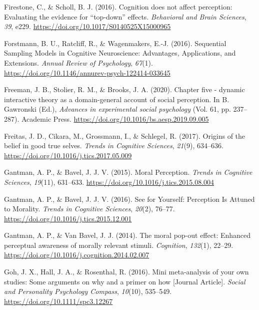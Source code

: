 \documentclass[
  man]{apa6}
\newlength{\cslhangindent}
\newlength{\cslentryspacingunit} %
\newenvironment{CSLReferences}[2] %
 {%
  \setlength{\parindent}{0pt}
  \ifodd #1
  \let\oldpar\par
  \def\par{\hangindent=\cslhangindent\oldpar}
  \fi
  \setlength{\parskip}{#2\cslentryspacingunit}
 }%
 {}
\begin{document}
\begin{CSLReferences}{1}{0}
\leavevmode{}%
Firestone, C., \& Scholl, B. J. (2016). Cognition does not affect perception: {Evaluating} the evidence for {``top-down''} effects. \emph{Behavioral and Brain Sciences}, \emph{39}, e229. \url{https://doi.org/10.1017/S0140525X15000965}

\leavevmode{}%
Forstmann, B. U., Ratcliff, R., \& Wagenmakers, E.-J. (2016). Sequential {Sampling} {Models} in {Cognitive} {Neuroscience}: {Advantages}, {Applications}, and {Extensions}. \emph{Annual Review of Psychology}, \emph{67}(1). \url{https://doi.org/10.1146/annurev-psych-122414-033645}

\leavevmode{}%
Freeman, J. B., Stolier, R. M., \& Brooks, J. A. (2020). Chapter five - dynamic interactive theory as a domain-general account of social perception. In B. Gawronski (Ed.), \emph{Advances in experimental social psychology} (Vol. 61, pp. 237--287). Academic Press. \url{https://doi.org/10.1016/bs.aesp.2019.09.005}

\leavevmode{}%
Freitas, J. D., Cikara, M., Grossmann, I., \& Schlegel, R. (2017). Origins of the belief in good true selves. \emph{Trends in Cognitive Sciences}, \emph{21}(9), 634--636. \url{https://doi.org/10.1016/j.tics.2017.05.009}

\leavevmode{}%
Gantman, A. P., \& Bavel, J. J. V. (2015). Moral {Perception}. \emph{Trends in Cognitive Sciences}, \emph{19}(11), 631--633. \url{https://doi.org/10.1016/j.tics.2015.08.004}

\leavevmode{}%
Gantman, A. P., \& Bavel, J. J. V. (2016). See for {Yourself}: {Perception} {Is} {Attuned} to {Morality}. \emph{Trends in Cognitive Sciences}, \emph{20}(2), 76--77. \url{https://doi.org/10.1016/j.tics.2015.12.001}

\leavevmode{}%
Gantman, A. P., \& Van Bavel, J. J. (2014). The moral pop-out effect: Enhanced perceptual awareness of morally relevant stimuli. \emph{Cognition}, \emph{132}(1), 22--29. \url{https://doi.org/10.1016/j.cognition.2014.02.007}

\leavevmode{}%
Goh, J. X., Hall, J. A., \& Rosenthal, R. (2016). Mini meta-analysis of your own studies: Some arguments on why and a primer on how {[}Journal Article{]}. \emph{Social and Personality Psychology Compass}, \emph{10}(10), 535--549. \url{https://doi.org/10.1111/spc3.12267}


\end{CSLReferences}
\end{document}
